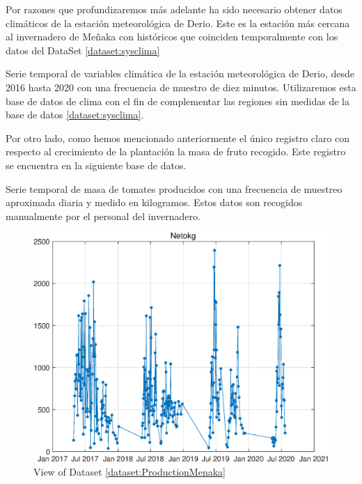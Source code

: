 Por razones que profundizaremos más adelante ha sido necesario obtener datos climáticos de la estación meteorológica de Derio. Este es la estación más cercana al invernadero de Meñaka con históricos que coinciden temporalmente con los datos del DataSet \ref{dataset:sysclima}

\begin{dataset}\label{dataset:Euskalmet}
    Serie temporal de variables climática de la estación meteorológica de Derio, desde 2016 hasta 2020 con una frecuencia de muestro de diez minutos. Utilizaremos esta base de datos de clima con el fin de complementar las regiones sin medidas de la base de datos \ref{dataset:sysclima}.
\end{dataset}

Por otro lado, como hemos mencionado anteriormente el único registro claro con respecto al crecimiento de la plantación la masa de fruto recogido. Este registro se encuentra en la siguiente base de datos.

\begin{dataset}\label{dataset:ProductionMenaka}
    Serie temporal de masa de tomates producidos con una frecuencia de muestreo aproximada diaria y medido en kilogramos. Estos datos son recogidos manualmente por el personal del invernadero.
\end{dataset}

\begin{figure}
    \centering
    \includegraphics[scale=0.4]{img/ProdMenaka.eps}
    \caption{View of Dataset \ref{dataset:ProductionMenaka}}
\end{figure}


